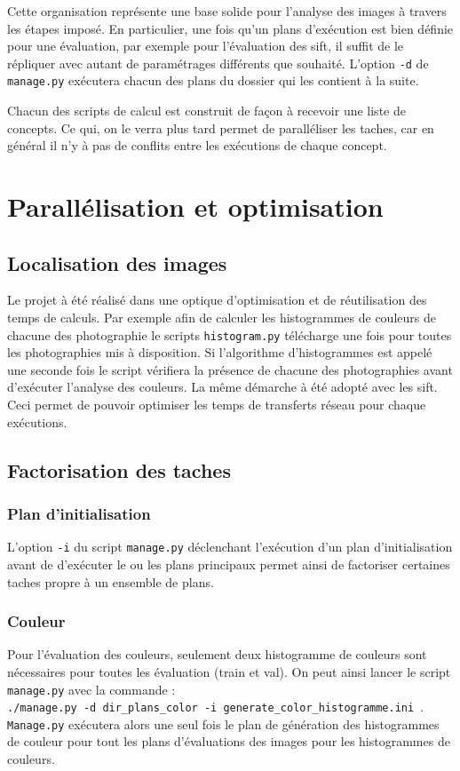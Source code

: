 \documentclass[a4paper, 11pt]{article}
\begin{document}
Cette organisation représente une base solide pour l'analyse des images à travers les étapes imposé. En particulier, une fois qu'un plans d'exécution est bien définie pour une évaluation, par exemple pour l'évaluation des sift, il suffit de le répliquer avec autant de paramétrages différents que souhaité. L'option \texttt{-d} de \texttt{manage.py} exécutera chacun des plans du dossier qui les contient à la suite.

Chacun des scripts de calcul est construit de façon à recevoir une liste de concepts. Ce qui, on le verra plus tard permet de paralléliser les taches, car en général il n'y à pas de conflits entre les exécutions de chaque concept.

\section{Parallélisation et optimisation}

\subsection{Localisation des images}
Le projet à été réalisé dans une optique d'optimisation et de réutilisation des temps de calculs. Par exemple afin de calculer les histogrammes de couleurs de chacune des photographie le scripts
\texttt{histogram.py} télécharge une fois pour toutes les photographies mis à disposition. Si l'algorithme d'histogrammes est appelé une seconde fois le script vérifiera la présence de chacune des photographies avant d'exécuter l'analyse des couleurs. La même démarche à été adopté avec les sift. Ceci permet de pouvoir optimiser les temps de transferts réseau pour chaque exécutions.

\subsection{Factorisation des taches}
\subsubsection{Plan d'initialisation}
L'option \texttt{-i} du script \texttt{manage.py} déclenchant l'exécution d'un plan d'initialisation avant de d'exécuter le ou les plans principaux permet ainsi de factoriser certaines taches propre à un ensemble de plans.
\subsubsection{Couleur}
Pour l'évaluation des couleurs, seulement deux histogramme de couleurs sont nécessaires pour toutes les évaluation (train et val). On peut ainsi lancer le script \texttt{manage.py} avec la commande : \\ \texttt{./manage.py -d dir\_plans\_color  -i generate\_color\_histogramme.ini }.
\\ \texttt{Manage.py} exécutera alors une seul fois le plan de génération des histogrammes de couleur pour tout les plans d'évaluations des images pour les histogrammes de couleurs.
\end{document}
